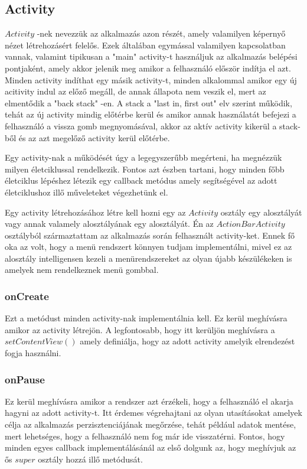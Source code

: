 \documentclass[12pt]{report}
\theoremstyle{definition}
\begin{document}
	\subsection*{Activity}
	$Activity$ -nek nevezzük az alkalmazás azon részét, amely valamilyen képernyő nézet létrehozásért felelős. Ezek általában egymással valamilyen kapcsolatban vannak, valamint tipikusan a "main" activity-t használjuk az alkalmazás belépési pontjaként, amely akkor jelenik meg amikor a felhasználó először indítja el azt. Minden activity indíthat egy másik activity-t, minden alkalommal amikor egy új acitivity indul az előző megáll, de annak állapota nem veszik el, mert az elmentődik a "back stack" -en. A stack a "last in, first out" elv szerint működik, tehát az új activity mindig előtérbe kerül és amikor annak használatát befejezi a felhasználó a vissza gomb megnyomásával, akkor az aktív activity kikerül a stack-ből és az azt megelőző activity kerül előtérbe.
	
	Egy activity-nak a működését úgy a legegyszerűbb megérteni, ha megnézzük milyen életciklussal rendelkezik. Fontos azt észben tartani, hogy minden főbb életciklus lépéshez létezik egy callback metódus amely segítségével az adott életciklushoz illő műveleteket végezhetünk el.
	
	Egy activity létrehozásához létre kell hozni egy az $Activity$ osztály egy alosztályát vagy annak valamely alosztályának egy alosztályát. Én az $ActionBarActivity$ osztályból származtattam az alkalmazás során felhasznált activity-ket. Ennek fő oka az volt, hogy a menü rendszert könnyen tudjam implementálni, mivel ez az alosztály intelligensen kezeli a menürendszereket az olyan újabb készülékeken is amelyek nem rendelkeznek menü gombbal.
	
	\subsubsection{onCreate}
	Ezt a metódust minden activity-nak implementálnia kell. Ez kerül meghívásra amikor az activity létrejön. A legfontosabb, hogy itt kerüljön meghívásra a $setContentView\left(\right)$ amely definiálja, hogy az adott activity amelyik elrendezést fogja használni.
	
	\subsubsection{onPause}
	Ez kerül meghívásra amikor a rendszer azt érzékeli, hogy a felhasználó el akarja hagyni az adott activity-t. Itt érdemes végrehajtani az olyan utasításokat amelyek célja az alkalmazás perzisztenciájának megőrzése, tehát például adatok mentése, mert lehetséges, hogy a felhasználó nem fog már ide visszatérni. 
	\newline
	\newline
	Fontos, hogy minden egyes callback implementálásánál az első dolgunk az, hogy meghívjuk az ős $super$ osztály hozzá illő metódusát.
	
\end{document}
